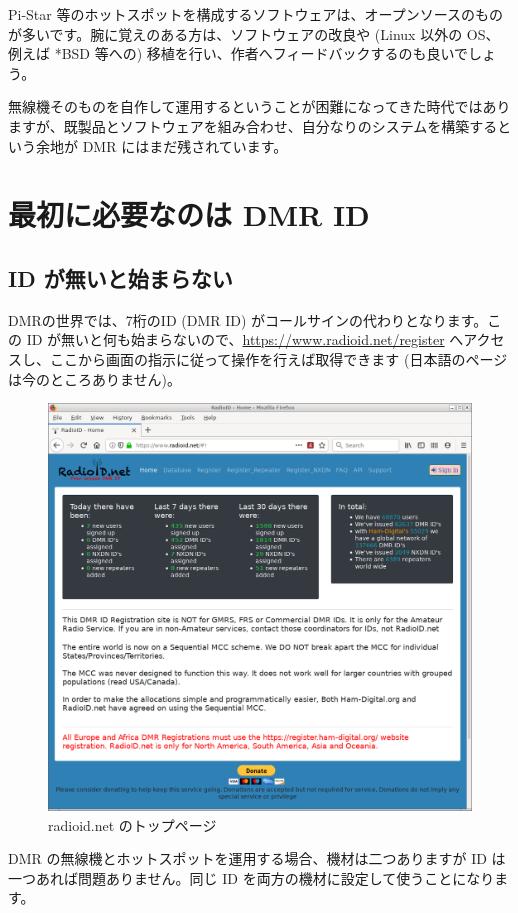 \documentclass[a4j,oneside]{ujbook}
\begin{document}
Pi-Star 等のホットスポットを構成するソフトウェアは、オープンソースのものが多いです。腕に覚えのある方は、ソフトウェアの改良や (Linux 以外の OS、例えば *BSD 等への) 移植を行い、作者へフィードバックするのも良いでしょう。

無線機そのものを自作して運用するということが困難になってきた時代ではありますが、既製品とソフトウェアを組み合わせ、自分なりのシステムを構築するという余地が DMR にはまだ残されています。

\chapter{最初に必要なのは DMR ID}

\section{ID が無いと始まらない}

DMRの世界では、7桁のID (DMR ID) がコールサインの代わりとなります。この ID が無いと何も始まらないので、\url{https://www.radioid.net/register} へアクセスし、ここから画面の指示に従って操作を行えば取得できます (日本語のページは今のところありません)。
\begin{figure}[H]
 \centering
 \includegraphics[width=15cm]{img/radioid_net.png}
 \caption{radioid.net のトップページ}
\end{figure}
DMR の無線機とホットスポットを運用する場合、機材は二つありますが ID は一つあれば問題ありません。同じ ID を両方の機材に設定して使うことになります。
\end{document}
